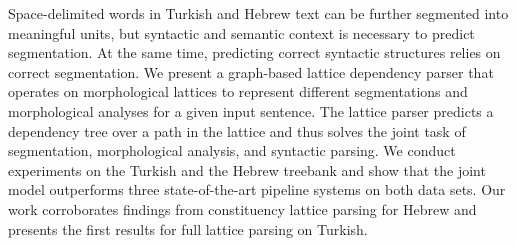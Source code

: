 Space-delimited words in Turkish and Hebrew text can be further segmented into meaningful units, but syntactic and semantic context is necessary to predict segmentation. At the same time, predicting correct syntactic structures relies on correct segmentation. We present a graph-based lattice dependency parser that operates on morphological lattices to represent different segmentations and morphological analyses for a given input sentence. The lattice parser predicts a dependency tree over a path in the lattice and thus solves the joint task of segmentation, morphological analysis, and syntactic parsing. We conduct experiments on the Turkish and the Hebrew treebank and show that the joint model outperforms three state-of-the-art pipeline systems on both data sets. Our work corroborates findings from constituency lattice parsing for Hebrew and presents the first results for full lattice parsing on Turkish.

